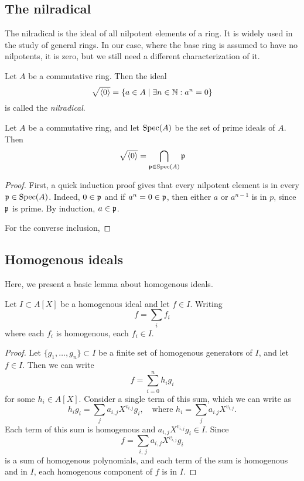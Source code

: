 \subsection{The nilradical}
The nilradical is the ideal of all nilpotent elements of a ring. It is widely used in the study of general rings. In our case, where the base ring is assumed to have no nilpotents, it is zero, but we still need a different characterization of it.

\begin{definition}[Nilradical]
  Let $A$ be a commutative ring. Then the ideal \[\sqrt{\langle 0 \rangle} = \{a \in A \mid \exists n \in \mathbb{N} : a^{n} = 0\}\] is called the \textit{nilradical}.
\end{definition}

\begin{theorem}\label{thm:nil_rad_is_cap_primes}
  Let $A$ be a commutative ring, and let $\operatorname{Spec}(A)$ be the set of prime ideals of $A$. Then
  \[\sqrt{\langle 0 \rangle} = \bigcap_{\mathfrak p \in \operatorname{Spec}(A)} \mathfrak p\]
\end{theorem}
\begin{proof}
  First, a quick induction proof gives that every nilpotent element is in every $\mathfrak p \in \operatorname{Spec}(A)$. Indeed, $0 \in \mathfrak p$ and if $a^{n} = 0 \in \mathfrak p$, then either $a$ or $a^{n-1}$ is in $p$, since $\mathfrak p$ is prime. By induction, $a \in \mathfrak p$.

  For the converse inclusion,
\end{proof}




\subsection{Homogenous ideals}

Here, we present a basic lemma about homogenous ideals.

\begin{lemma}\label{lem:homo_components}
  Let $I \subset A[X]$ be a homogenous ideal and let $f \in I$. Writing
  \[f = \sum_{i} f_{i}\]
  where each $f_{i}$ is homogenous, each $f_{i} \in I$.
\end{lemma}
\begin{proof}
  Let $\{g_{1}, \dots, g_{n}\} \subset I$ be a finite set of homogenous generators of $I$, and let $f \in I$. Then we can write
  \[f = \sum_{i=0}^{n} h_{i} g_{i}\]
  for some $h_{i} \in A[X]$. Consider a single term of this sum, which we can write as
  \[h_{i} g_{i} = \sum_{j} a_{i,j}X^{v_{i,j}} g_{i}, \quad \text{where } h_{i} = \sum_{j} a_{i.j}X^{v_{i,j}}.\]
  Each term of this sum is homogenous and $a_{i,j} X^{v_{i,j}} g_{i} \in I$. Since
  \[f = \sum_{i,\,j} a_{i,j} X^{v_{i, j}} g_{i}\]
  is a sum of homogenous polynomials, and each term of the sum is homogenous and in $I$, each homogenous component of $f$ is in $I$.
\end{proof}
